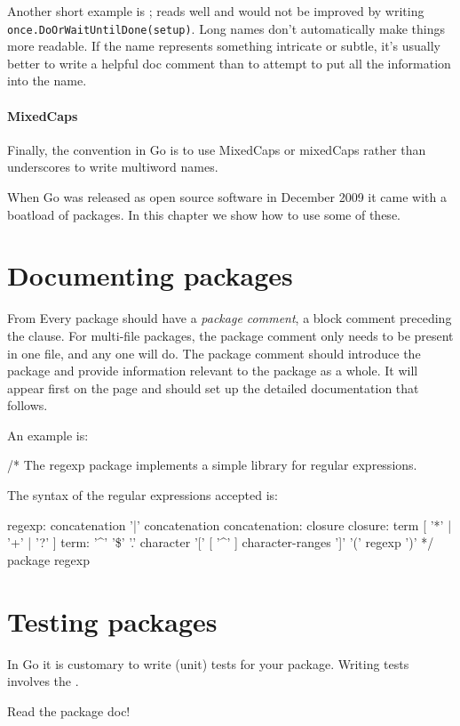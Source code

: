 Another short example is ;  reads well and would
not be improved by writing \lstinline{once.DoOrWaitUntilDone(setup)}. Long names
don't automatically make things more readable. If the name represents
something intricate or subtle, it's usually better to write a helpful
doc comment than to attempt to put all the information into the name.

\paragraph{MixedCaps}
Finally, the convention in Go is to use MixedCaps or mixedCaps rather
than underscores to write multiword names.

When Go was released as open source software in December 2009 it came
with a boatload of packages. In this chapter we show how to use some
of these.


\section{Documenting packages}
From \cite{effective_go}
Every package should have a \emph{package comment}, a block comment preceding the
  clause. For multi-file packages, the package comment only needs to be
present in one file, and any one will do. The package comment should introduce
the package and provide information relevant to the package as a whole. It will
appear first on the  page and should set up the detailed documentation
that follows.

An example is:
\begin{display}
/*
    The regexp package implements a simple library for
    regular expressions.

    The syntax of the regular expressions accepted is:

    regexp:
        concatenation { '|' concatenation }
    concatenation:
        { closure }
    closure:
        term [ '*' | '+' | '?' ]
    term:
        '^'
        '\$'
        '.'
        character
        '[' [ '^' ] character-ranges ']'
        '(' regexp ')'
*/
package regexp
\end{display}





\section{Testing packages}
In Go it is customary to write (unit) tests for your package. Writing
tests involves the .
\begin{lbar}
Read the package doc!
\end{lbar}

